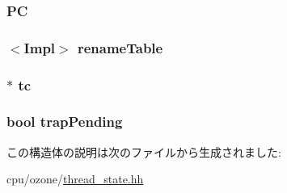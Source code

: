 \label{structOzoneThreadState_afdfc33b720511483d84f7098ab6ba075}
\hypertarget{structOzoneThreadState_ab4fee9d7e100be71a104b4b714909357}{
\subsubsection[{PC}]{ {\bf PC}}}
\label{structOzoneThreadState_ab4fee9d7e100be71a104b4b714909357}
\hypertarget{structOzoneThreadState_af8d3f859e7c0dd9408ba99de6f415616}{
\subsubsection[{renameTable}]{$<$Impl$>$ {\bf renameTable}}}
\label{structOzoneThreadState_af8d3f859e7c0dd9408ba99de6f415616}
\hypertarget{structOzoneThreadState_a4455a4759e69e5ebe68ae7298cbcc37d}{
\subsubsection[{tc}]{$\ast$ {\bf tc}}}
\label{structOzoneThreadState_a4455a4759e69e5ebe68ae7298cbcc37d}
\hypertarget{structOzoneThreadState_aa9f948437524f88e51afd737df505200}{
\subsubsection[{trapPending}]{\setlength{\rightskip}{0pt plus 5cm}bool {\bf trapPending}}}
\label{structOzoneThreadState_aa9f948437524f88e51afd737df505200}


この構造体の説明は次のファイルから生成されました:\begin{DoxyCompactItemize}
\item 
cpu/ozone/\hyperlink{ozone_2thread__state_8hh}{thread\_\-state.hh}\end{DoxyCompactItemize}

